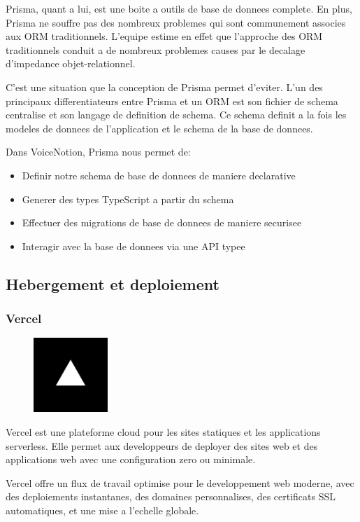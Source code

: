 Prisma, quant a lui, est une boite a outils de base de donnees complete. En plus, Prisma ne souffre pas des nombreux problemes qui sont communement associes aux ORM traditionnels. L'equipe estime en effet que l'approche des ORM traditionnels conduit a de nombreux problemes causes par le decalage d'impedance objet-relationnel.

C'est une situation que la conception de Prisma permet d'eviter. L'un des principaux differentiateurs entre Prisma et un ORM est son fichier de schema centralise et son langage de definition de schema. Ce schema definit a la fois les modeles de donnees de l'application et le schema de la base de donnees.

Dans VoiceNotion, Prisma nous permet de:
\begin{itemize}
    \item Definir notre schema de base de donnees de maniere declarative
    \item Generer des types TypeScript a partir du schema
    \item Effectuer des migrations de base de donnees de maniere securisee
    \item Interagir avec la base de donnees via une API typee
\end{itemize}

\subsection{Hebergement et deploiement}

\subsubsection{Vercel}
\begin{figure}
    \centering
    \includegraphics[width=0.25\textwidth]{assets/docs/logo_vercel.png}
\end{figure}
Vercel est une plateforme cloud pour les sites statiques et les applications serverless. Elle permet aux developpeurs de deployer des sites web et des applications web avec une configuration zero ou minimale.

Vercel offre un flux de travail optimise pour le developpement web moderne, avec des deploiements instantanes, des domaines personnalises, des certificats SSL automatiques, et une mise a l'echelle globale.

